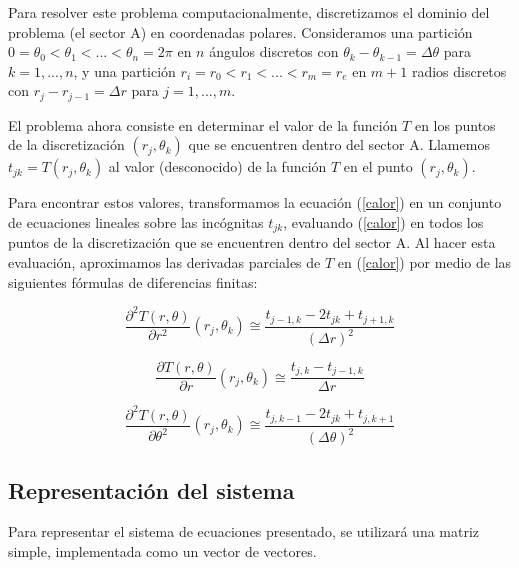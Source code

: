 \medskip

Para resolver este problema computacionalmente, discretizamos el dominio del problema (el sector A) en coordenadas polares. Consideramos una partici\'on $0 = \theta_0 < \theta_1 < ... < \theta_n = 2\pi$ en $n$ \'angulos discretos con $\theta_k-\theta_{k-1} = \Delta\theta$ para $k = 1,...,n$, y una partici\'on $r_i = r_0 < r_1 < ... < r_m = r_e$ en $m+1$ radios discretos con $r_j - r_{j-1} = \Delta r$ para $j = 1,...,m$.

\medskip

El problema ahora consiste en determinar el valor de la funci\'on $T$ en los puntos de la discretizaci\'on $(r_j,\theta_k)$ que se encuentren dentro del sector A. Llamemos $t_{jk} = T(r_j,\theta_k)$ al valor (desconocido) de la funci\'on $T$ en el punto $(r_j,\theta_k)$.

\medskip

Para encontrar estos valores, transformamos la ecuaci\'on (\ref{calor}) en un conjunto de ecuaciones lineales sobre las inc\'ognitas $t_{jk}$, evaluando (\ref{calor}) en todos los puntos de la discretizaci\'on que se encuentren dentro del sector A. Al hacer esta evaluaci\'on, aproximamos las derivadas parciales de $T$ en (\ref{calor}) por medio de las siguientes f\'ormulas de diferencias finitas:


\begin{equation}
\frac{\partial^2T(r,\theta)}{\partial r^2}(r_j,\theta_k) \cong \frac{t_{j-1,k}-2t_{jk}+t_{j+1,k}}{(\Delta r)^2}
\end{equation}

\begin{equation}
\frac{\partial T(r,\theta)}{\partial r}(r_j,\theta_k) \cong \frac{t_{j,k}-t_{j-1,k}}{\Delta r}
\end{equation}

\begin{equation}
\frac{\partial^2T(r,\theta)}{\partial \theta^2}(r_j,\theta_k) \cong \frac{t_{j,k-1}-2t_{jk}+t_{j,k+1}}{(\Delta \theta)^2}
\end{equation}


\subsection{Representación del sistema}

Para representar el sistema de ecuaciones presentado, se utilizará una matriz simple, implementada como un vector de vectores.

\medskip


